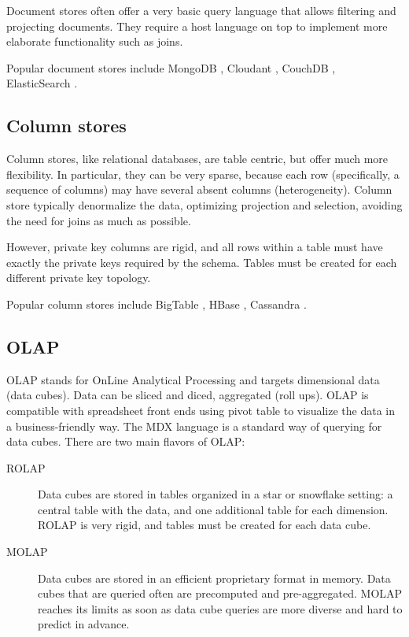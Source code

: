 \documentclass{acm_proc_article-sp}
\begin{document}
Document stores often offer a very basic query language that allows filtering and projecting documents. They require a host language on top to implement more elaborate functionality such as joins. 

Popular document stores include MongoDB \cite{MongoDB}, Cloudant \cite{Cloudant}, CouchDB \cite{CouchDB}, ElasticSearch \cite{ElasticSearch}.

\subsection{Column stores}

Column stores, like relational databases, are table centric, but offer much more flexibility. In particular, they can be very sparse, because each row (specifically, a sequence of columns) may have several absent columns (heterogeneity). Column store typically denormalize the data, optimizing projection and selection, avoiding the need for joins as much as possible.

However, private key columns are rigid, and all rows within a table must have exactly the private keys required by the schema. Tables must be created for each different private key topology.

Popular column stores include BigTable \cite{Chang2008}, HBase \cite{HBase}, Cassandra \cite{Lakshman2010}.

\subsection{OLAP}

OLAP \cite{Codd1993} stands for OnLine Analytical Processing and targets dimensional data (data cubes). Data can be sliced and diced, aggregated (roll ups). OLAP is compatible with spreadsheet front ends using pivot table to visualize the data in a business-friendly way. The MDX language \cite{Nolan1999} is a standard way of querying for data cubes. There are two main flavors of OLAP:
\begin{description}
\item[ROLAP] Data cubes are stored in tables organized in a star or snowflake setting: a central table with the data, and one additional table for each dimension. ROLAP is very rigid, and tables must be created for each data cube.
\item[MOLAP] Data cubes are stored in an efficient proprietary format in memory. Data cubes that are queried often are precomputed and pre-aggregated. MOLAP reaches its limits as soon as data cube queries are more diverse and hard to predict in advance.
\end{description}
\end{document}
